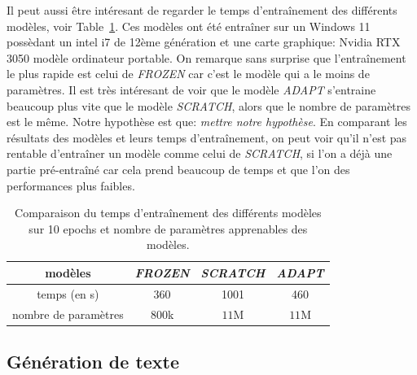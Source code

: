 \documentclass[a4paper]{article}
\begin{document}
Il peut aussi être intéresant de regarder le temps d'entraînement des différents modèles, voir Table~\ref{tab:times}. Ces modèles ont été
entraîner sur un Windows 11 possèdant un intel i7 de 12ème génération et une carte graphique: Nvidia RTX 3050 modèle ordinateur portable.
On remarque sans surprise que l'entraînement le plus rapide est celui de \textit{FROZEN} car c'est le modèle qui a le moins de paramètres.
Il est très intéresant de voir que le modèle \textit{ADAPT} s'entraine beaucoup plus vite que le modèle \textit{SCRATCH}, alors que le
nombre de paramètres est le même. Notre hypothèse est que: \textit{mettre notre hypothèse}.
En comparant les résultats des modèles et leurs temps d'entraînement, on peut voir qu'il n'est pas rentable d'entraîner un modèle comme
celui de \textit{SCRATCH}, si l'on a déjà une partie pré-entraîné car cela prend beaucoup de temps et que l'on des performances 
plus faibles.

\begin{table}[ht]
    \centering
    \begin{tabular}{|c|c|c|c|}
        \hline
        modèles & \textit{FROZEN} & \textit{SCRATCH} & \textit{ADAPT} \\
        \hline
        temps (en s) & 360 & 1001 & 460 \\
        \hline
        nombre de paramètres & $800$k & $11$M & $11$M \\
        \hline
    \end{tabular}
    \caption{Comparaison du temps d'entraînement des différents modèles sur 10 epochs et nombre de paramètres apprenables des modèles.}
    \label{tab:times}
\end{table}

\subsection{Génération de texte}

\newpage

\printbibliography
\end{document}
